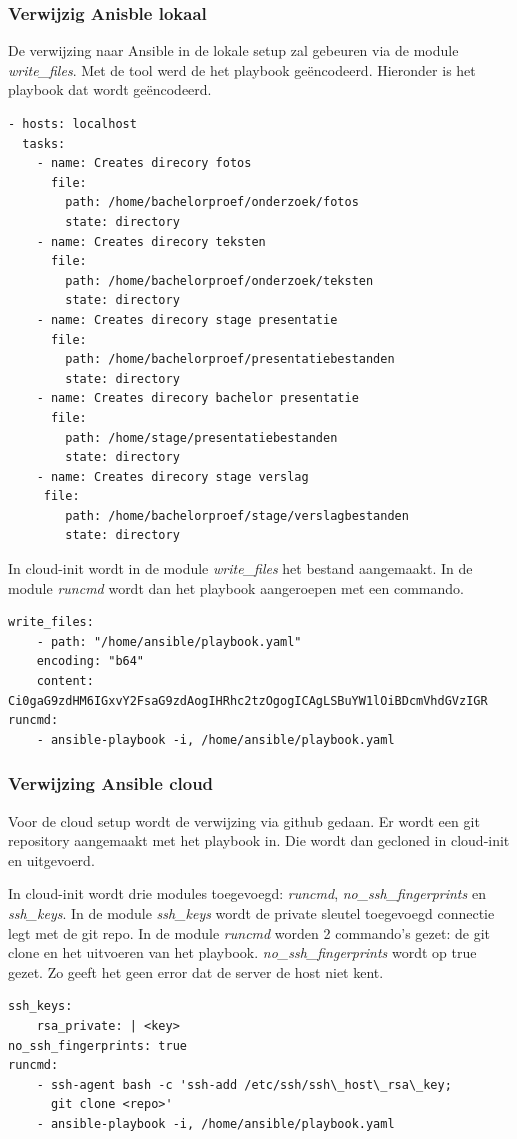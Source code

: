 \subsubsection{Verwijzig Anisble lokaal}
De verwijzing naar Ansible in de lokale setup zal gebeuren via de module \textit{write\_files}. Met de tool \autocite{toolbas64} werd de het playbook geëncodeerd. Hieronder is het playbook dat wordt geëncodeerd.
\begin{lstlisting}
- hosts: localhost
  tasks:
	- name: Creates direcory fotos
	  file:
		path: /home/bachelorproef/onderzoek/fotos
		state: directory
	- name: Creates direcory teksten
	  file:
		path: /home/bachelorproef/onderzoek/teksten
		state: directory
	- name: Creates direcory stage presentatie
	  file:
		path: /home/bachelorproef/presentatiebestanden
		state: directory
	- name: Creates direcory bachelor presentatie
	  file:
		path: /home/stage/presentatiebestanden
		state: directory
	- name: Creates direcory stage verslag
	 file:
		path: /home/bachelorproef/stage/verslagbestanden
		state: directory
\end{lstlisting}

In cloud-init wordt in de module \textit{write\_files} het bestand aangemaakt. In de module \textit{runcmd} wordt dan het playbook aangeroepen met een commando.
\begin{lstlisting}
write_files:
	- path: "/home/ansible/playbook.yaml"
	encoding: "b64"
	content: Ci0gaG9zdHM6IGxvY2FsaG9zdAogIHRhc2tzOgogICAgLSBuYW1lOiBDcmVhdGVzIGR
runcmd:
	- ansible-playbook -i, /home/ansible/playbook.yaml
\end{lstlisting}

\subsubsection{Verwijzing Ansible cloud}
Voor de cloud setup wordt de verwijzing via github gedaan. Er wordt een git repository aangemaakt met het playbook in. Die wordt dan gecloned in cloud-init en uitgevoerd.

In cloud-init wordt drie modules toegevoegd: \textit{runcmd}, \textit{no\_ssh\_fingerprints} en \textit{ssh\_keys}. In de module \textit{ssh\_keys} wordt de private sleutel toegevoegd connectie legt met de git repo. In de module \textit{runcmd} worden 2 commando's gezet: de git clone en het uitvoeren van het playbook. \textit{no\_ssh\_fingerprints} wordt op true gezet. Zo geeft het geen error dat de server de host niet kent.
\begin{lstlisting}
ssh_keys:
	rsa_private: | <key>
no_ssh_fingerprints: true
runcmd:
	- ssh-agent bash -c 'ssh-add /etc/ssh/ssh\_host\_rsa\_key; 
	  git clone <repo>'
	- ansible-playbook -i, /home/ansible/playbook.yaml
\end{lstlisting}

